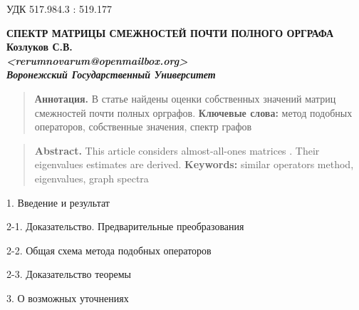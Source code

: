\documentclass[12pt]{article}
\theoremstyle{definition}
\theoremstyle{plain}
\theoremstyle{remark}
\begin{document}
\setcounter{thm}{0}
\setcounter{lemma}{0}
\quad УДК 517.984.3 : 519.177

\begin{center}
%
\vskip0.5cm
\textbf{СПЕКТР МАТРИЦЫ СМЕЖНОСТЕЙ ПОЧТИ ПОЛНОГО ОРГРАФА}\\
\vskip0.5cm
\textbf{
    \textbf{Козлуков С.В.\footnotemark} \\
    \textit{<rerumnovarum@openmailbox.org>} \\
    \textit{Воронежский Государственный Университет}
}
\end{center}


\begin{quote}
    \small{{\bf Аннотация.}
    В статье найдены оценки собственных значений
    матриц смежностей почти полных орграфов.
    }
    \textbf{Ключевые слова:}
    \small{метод подобных операторов, собственные значения, спектр графов}
\end{quote}

\begin{quote}
    \small{{\bf Abstract.}
    This article considers almost-all-ones matrices
.%
    Their eigenvalues estimates are derived.
    }
    \textbf{Keywords:}
    \small{similar operators method, eigenvalues, graph spectra}
\end{quote}

\begin{center}{1. Введение и результат}\end{center}

\begin{center}{2-1. Доказательство. Предварительные преобразования}\end{center}


\begin{center}{2-2. Общая схема метода подобных операторов}\end{center}

\begin{center}{2-3. Доказательство теоремы}\end{center}

\begin{center}3. О возможных уточнениях\end{center}


\end{document}
